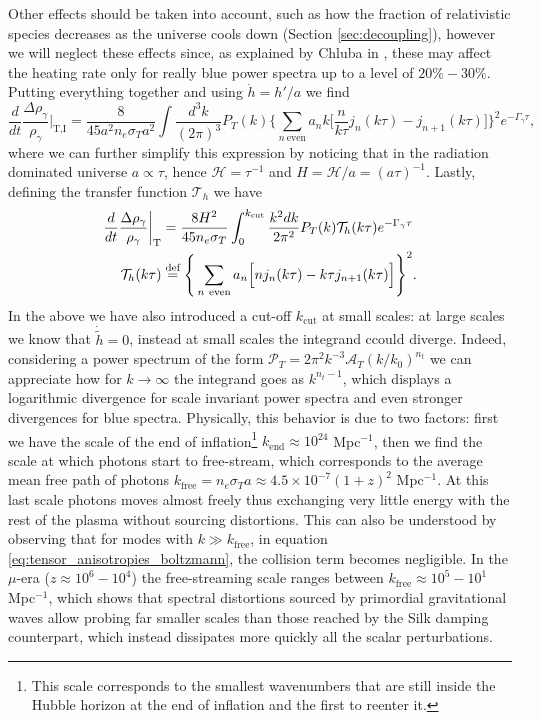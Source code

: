 Other effects should be taken into account, such as how the fraction of relativistic species decreases as the universe cools down (Section \ref{sec:decoupling}), however we will neglect these effects since, as explained by Chluba in \cite{Chluba_tens_diss}, these may affect the heating rate only for really blue power spectra up to a level of $20\%-30\%$.\\
Putting everything together and using $\dot h=h'/a$ we find
$$
    \frac{d}{dt}\frac{\Delta\rho_\gamma}{\rho_\gamma}\bigg|_\text{T,I}=\frac{8}{45a^2n_e\sigma_Ta^2}\int\frac{d^3k}{(2\pi)^3}{P}_T (k)\Bigg\{\sum_{n\ \text{even}}a_nk\bigg[\frac{n}{k\tau}j_n(k\tau)-j_{n+1}(k\tau)\bigg]\Bigg\}^2e^{-\Gamma_\gamma\tau},
$$
where we can further simplify this expression by noticing that in the radiation dominated universe $a\propto\tau$, hence $\mathcal H=\tau^{-1}$ and $H=\mathcal{H}/a=(a\tau)^{-1}$. Lastly, defining the transfer function $\mathcal T_h$ we have
\begin{align}
    \label{eq:tightCoupling_tensor_heatingRate}
     \frac{d}{dt}\frac{\Delta\rho_\gamma}{\rho_\gamma}\bigg|_\text{T}&=\frac{8H^2}{45n_e\sigma_T}\int_0^{k_\text{cut}}\frac{k^2dk}{2\pi^2}{P}_T (k)\mathcal{T}_h(k\tau)e^{-\Gamma_\gamma\tau}\\
    \mathcal{T}_h(k\tau)&\defeq \Bigg\{\sum_{n\ \text{even}}a_n\Big[nj_n(k\tau)-k\tau j_{n+1}(k\tau)\Big]\Bigg\}^2.\nonumber
\end{align}
In the above we have also introduced a cut-off $k_\text{cut}$ at small scales: at large scales we know that $\dot{\tilde h}=0$, instead at small scales the integrand ccould diverge. Indeed, considering a power spectrum of the form $\mathcal{P}_T=2\pi^2k^{-3}\mathcal A_T(k/k_0)^{n_t}$ we can appreciate how for $k\to\infty$ the integrand goes as $k^{n_t-1}$, which displays a logarithmic divergence for scale invariant power spectra and even stronger divergences for blue spectra. Physically, this behavior is due to two factors: first we have the scale of the end of inflation\footnote{This scale corresponds to the smallest wavenumbers that are still inside the Hubble horizon at the end of inflation and the first to reenter it.} $k_\text{end}\approx 10^{24}$ Mpc$^{-1}$, then we find the scale at which photons start to free-stream, which corresponds to the average mean free path of photons $k_\text{free}=n_e\sigma_Ta\approx4.5\times10^{-7}(1+z)^2$ Mpc$^{-1}$. At this last scale photons moves almost freely thus exchanging very little energy with the rest of the plasma without sourcing distortions. This can also be understood by observing that for modes with $k\gg k_\text{free}$, in equation \eqref{eq:tensor_anisotropies_boltzmann}, the collision term becomes negligible.  In the $\mu$-era ($z\approx10^6-10^4 $) the free-streaming scale ranges between $k_\text{free}\approx 10^{5}-10^{1}$ Mpc$^{-1}$, which shows that spectral distortions sourced by primordial gravitational waves allow probing far smaller scales than those reached by the Silk damping counterpart, which instead dissipates more quickly all the scalar perturbations. 

